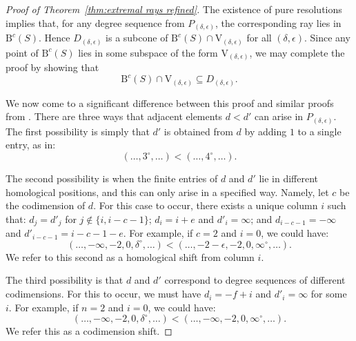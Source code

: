 \documentclass[12pt]{amsart}
\theoremstyle{definition}
\theoremstyle{remark}
\newcommand{\VV}{\mathrm{V}}
\newcommand{\cc}{c}
\newcommand{\dd}{d}
\newcommand{\defi}[1]{\textsf{#1}} %
\newcommand{\BBQ}{\mathrm{B}}
\begin{document}
\begin{proof}[Proof of Theorem~\ref{thm:extremal rays refined}]
The existence of pure resolutions~\cite[Theorem~0.1]{eis-schrey1} implies that, for any degree sequence from $P_{(\delta,\epsilon)}$, the corresponding ray lies in $\BBQ^{\cc}(S)$.  Hence $D_{(\delta,\epsilon)}$ is a subcone of $\BBQ^{\cc}(S)\cap \VV_{(\delta,\epsilon)}$ for all $(\delta,\epsilon)$.  
Since any point of $\BBQ^{\cc}(S)$ lies in some subspace of the form $\VV_{(\delta,\epsilon)}$, we may complete the proof by showing that
\begin{equation}\label{eqn:inclusion}
\BBQ^{\cc}(S)\cap \VV_{(\delta,\epsilon)} \subseteq D_{(\delta,\epsilon)}.
\end{equation}

We now come to a significant difference between this proof and similar proofs from \cites{eis-schrey1,boij-sod2}.  There are three ways that  adjacent elements $d<d'$ can arise in $P_{(\delta,\epsilon)}$.   The first possibility is simply that $d'$ is obtained from $\dd$ by adding $1$ to a single entry, as in:
\[
(\dots,3^\circ,\dots)<(\dots,4^\circ,\dots).
\]

The second possibility is when the finite entries of $\dd$ and $d'$ lie in different homological positions, and this can only arise in a specified way.  Namely, let $c$ be the codimension of $\dd$.  For this case to occur, there exists a unique column $i$ such that: $d_j=d'_j$ for $j\notin \{i, i-c-1\}$; $d_i=i+e$ and $d'_i=\infty$; and $d_{i-c-1}=-\infty$ and $d'_{i-c-1}=i-c-1-e$.  For example, if $c=2$ and $i=0$, we could have:
\[
(\dots, -\infty, -2, 0, \delta^\circ, \dots)<(\dots, -2-\epsilon,-2, 0, \infty^\circ, \dots).
\]
We refer to this second as a \defi{homological shift from column $i$}.

The third possibility is that $\dd$ and $d'$ correspond to degree sequences of different codimensions.  For this to occur, we must have $d_{i}=-f+i$ and $d'_i=\infty$ for some $i$.  
For example, if $n=2$ and $i=0$, we could have:
\[
(\dots, -\infty, -2, 0, \delta^\circ, \dots)<(\dots, -\infty,-2, 0, \infty^\circ, \dots).
\]
We refer this as a \defi{codimension shift}.  



\end{proof}
\end{document}
